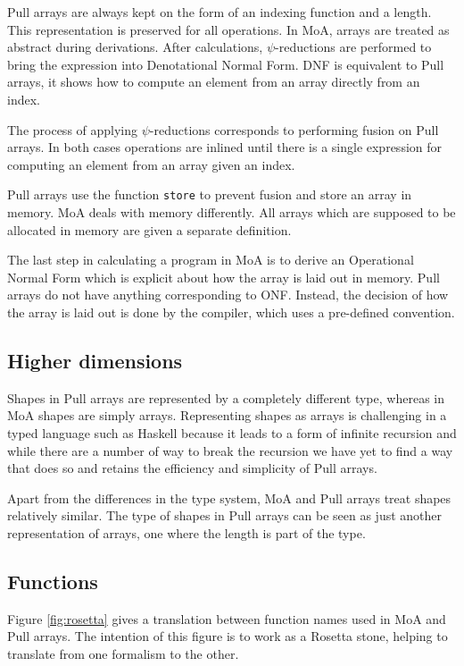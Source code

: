 \documentclass[preprint]{sigplanconf}
\begin{document}
Pull arrays are always kept on the form of an indexing function and a
length. This representation is preserved for all operations. In MoA,
arrays are treated as abstract during derivations. After calculations,
\(\psi\)-reductions are performed to bring the expression into
Denotational Normal Form. DNF is equivalent to Pull arrays, it shows
how to compute an element from an array directly from an index.

The process of applying \(\psi\)-reductions corresponds to performing
fusion on Pull arrays. In both cases operations are inlined until
there is a single expression for computing an element from an array
given an index.

Pull arrays use the function \verb!store! to prevent fusion and store
an array in memory. MoA deals with memory differently. All arrays
which are supposed to be allocated in memory are given a separate
definition.

The last step in calculating a program in MoA is to derive an
Operational Normal Form which is explicit about how the array is laid
out in memory. Pull arrays do not have anything corresponding to
ONF. Instead, the decision of how the array is laid out is done by the
compiler, which uses a pre-defined convention.

\subsection{Higher dimensions}
\label{sec:highdim}

Shapes in Pull arrays are represented by a completely different type,
whereas in MoA shapes are simply arrays. Representing shapes as arrays
is challenging in a typed language such as Haskell because it leads to
a form of infinite recursion and while there are a number of way to
break the recursion we have yet to find a way that does so and retains
the efficiency and simplicity of Pull arrays.

Apart from the differences in the type system, MoA and Pull arrays
treat shapes relatively similar. The type of shapes in Pull arrays can
be seen as just another representation of arrays, one where the length
is part of the type.

\subsection{Functions}
\label{sec:notation}

Figure \ref{fig:rosetta} gives a translation between function names
used in MoA and Pull arrays. The intention of this figure is to work
as a Rosetta stone, helping to translate from one formalism to the
other.
\end{document}
